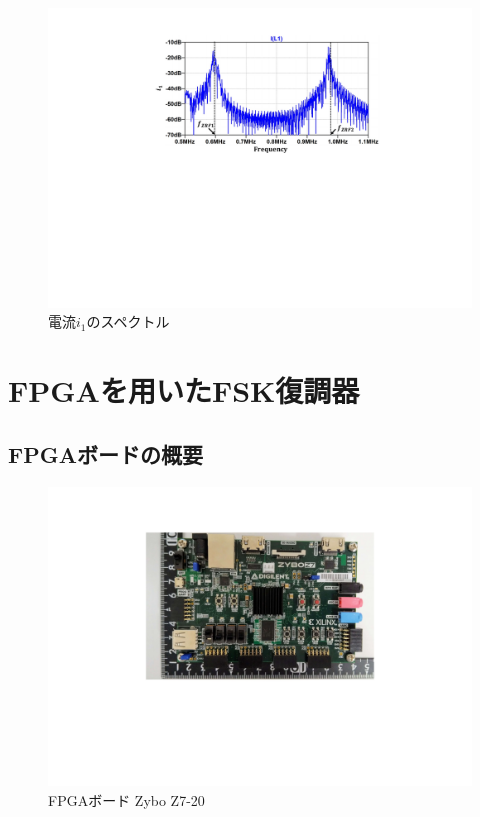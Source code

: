 \begin{figure}[!h]
\begin{center}

\includegraphics[width=140mm]{figures/fsksimulationgraph3.pdf}
\caption{電流$i_1$のスペクトル}
\label{fsksimulationgraph3}

\end{center}
\end{figure}
\section{FPGAを用いたFSK復調器}
\subsection{FPGAボードの概要}

\begin{figure}[t]
\begin{center}

\includegraphics[width=140mm]{figures/fpgaphoto.pdf}
\caption{FPGAボード Zybo Z7-20}
\label{fpgaphoto}

\end{center}
\end{figure}

